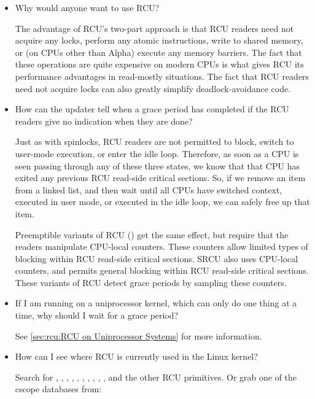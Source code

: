 \begin{itemize}
\item Why would anyone want to use RCU\@?

  The advantage of RCU's two-part approach is that RCU readers need
  not acquire any locks, perform any atomic instructions, write to
  shared memory, or (on CPUs other than Alpha) execute any memory
  barriers.
  The fact that these operations are quite expensive
  on modern CPUs is what gives RCU its performance advantages
  in read-mostly situations.
  The fact that RCU readers need not
  acquire locks can also greatly simplify deadlock-avoidance code.

\item How can the updater tell when a grace period has completed
  if the RCU readers give no indication when they are done?

  Just as with spinlocks, RCU readers are not permitted to
  block, switch to user-mode execution, or enter the idle loop.
  Therefore, as soon as a CPU is seen passing through any of these
  three states, we know that that CPU has exited any previous RCU
  read-side critical sections.
  So, if we remove an item from a
  linked list, and then wait until all CPUs have switched context,
  executed in user mode, or executed in the idle loop, we can
  safely free up that item.

  Preemptible variants of RCU () get the
  same effect, but require that the readers manipulate CPU-local
  counters.
  These counters allow limited types of blocking within
  RCU read-side critical sections.
  SRCU also uses CPU-local
  counters, and permits general blocking within RCU read-side
  critical sections.
  These variants of RCU detect grace periods
  by sampling these counters.

\item If I am running on a uniprocessor kernel, which can only do one
  thing at a time, why should I wait for a grace period?

  See \cref{sec:rcu:RCU on Uniprocessor Systems} for more information.

\item How can I see where RCU is currently used in the Linux kernel?

  Search for , , ,
  , , ,
  , , ,
  , and the other RCU primitives.
  Or grab one
  of the cscope databases from:


\end{itemize}
